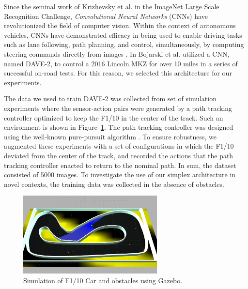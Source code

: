 \documentclass[manuscript,screen,review]{acmart}
\begin{document}
Since the seminal work of Krizhevsky et al. \cite{AlexNet2012} in the ImageNet Large Scale Recognition Challenge, \emph{Convolutional Neural Networks} (CNNs) have revolutionized the field of computer vision. Within the context of autonomous vehicles, CNNs have demonstrated efficacy in being used to enable driving tasks such as lane following, path planning, and control, simultaneously, by computing steering commands directly from images \cite{DeepDrive2015}. In \cite{bojarski2016end} Bojarski et al. utilized a CNN, named DAVE-2, to control a 2016 Lincoln MKZ for over 10 miles in a series of successful on-road tests. For this reason, we selected this architecture for our experiments. 

The data we used to train DAVE-2 was collected from set of simulation experiments where the sensor-action pairs were generated by a path tracking controller optimized to keep the F1/10 in the center of the track. Such an environment is shown in Figure~\ref{fig:racetrack}. The path-tracking controller was designed using the well-known pure-pursuit algorithm \cite{coulter1992implementation}. To ensure robustness, we augmented these experiments with a set of configurations in which the F1/10 deviated from the center of the track, and recorded the actions that the path tracking controller enacted to return to the nominal path. In sum, the dataset consisted of 5000 images.  To investigate the use of our simplex architecture in novel contexts, the training data was collected in the absence of obstacles.
 


\begin{figure}[!htbp]
  \centering
    \includegraphics[width=0.65\textwidth]{figures/gazebo.jpg}
   \caption{Simulation of F1/10 Car and obstacles using Gazebo.}
  \label{fig:racetrack}
\end{figure}
\end{document}
